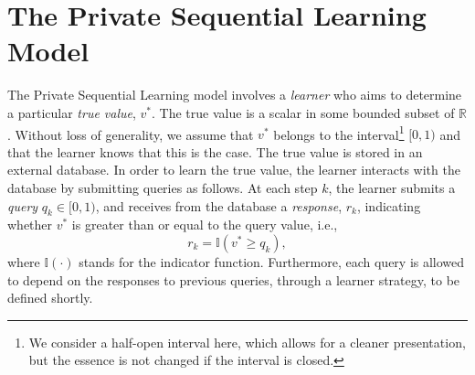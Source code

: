 \documentclass[final,12pt]{colt2018}
\begin{document}
\section{The Private Sequential Learning Model}
\label{sec:model}

The Private Sequential {Learning} model involves a \emph{{learner}} who aims to determine a particular \emph{true value}, $v^*$. The true value is a scalar in some bounded subset of $\mathbb{R}$. Without loss of generality, we assume that $v^*$ belongs to the interval\footnote{We consider a half-open interval here, which allows for a cleaner presentation, but the essence is not changed if the interval is closed.} $[0,  1)$ and that the {learner} knows that this is the case. The {true value} is stored in an external database. In order to learn the true value, the {learner} interacts with the database by submitting queries as follows. At each step $k$, the {learner} submits a \emph{query} $q_k\in[0,1)$, {and receives from the database a \emph{response}, $r_k$, indicating whether $v^*$ is greater than or equal to the query value}, i.e., 
\begin{equation*}
r_k = \mathbb{I}(v^*\geq q_k),%
\end{equation*}
where $\mathbb{I}(\cdot)$ stands for the indicator function. 
Furthermore, each query is allowed to depend on the responses to previous queries, through a {learner} strategy, to be defined shortly. 
\end{document}
